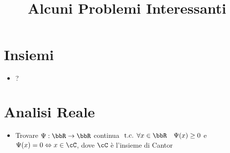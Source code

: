 \documentclass[a4paper,NoNotes,GeneralMath]{stdmdoc}
\begin{document}
	\title{Alcuni Problemi Interessanti}
	\autodate

	\section*{Insiemi}
	\begin{itemize}
		\item ?
	\end{itemize}

	\section*{Analisi Reale}
	\begin{itemize}
		\item Trovare $\Psi: \bbR\rar\bbR$ continua $\tc \forall x\in\bbR \quad \Psi(x)\ge 0$ e $\Psi(x) = 0 \sse x \in \cC$, dove $\cC$ è l'insieme di Cantor
	\end{itemize}
\end{document}
